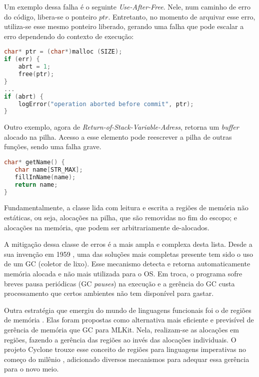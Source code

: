 Um exemplo dessa falha é o seguinte \emph{Use-After-Free}. Nele, num caminho de erro do código, libera-se o ponteiro $ptr$. Entretanto, no momento de arquivar esse erro, utiliza-se esse mesmo ponteiro liberado, gerando uma falha que pode escalar a erro dependendo do contexto de execução:
\begin{lstlisting}[language=C, label={lst:temporal-error-heap-c}, caption=Exemplo de uma Falha Temporal na \emph{Heap}]
char* ptr = (char*)malloc (SIZE);  
if (err) {
	abrt = 1;  
	free(ptr);
}  
...  
if (abrt) {
	logError("operation aborted before commit", ptr);
}
\end{lstlisting}

Outro exemplo, agora de \emph{Return-of-Stack-Variable-Adress}, retorna um \emph{buffer} alocado na pilha. Acesso a esse elemento pode reescrever a pilha de outras funções, sendo uma falha grave.

\begin{lstlisting}[language=C, label={lst:temporal-error-stack-c}, caption=Exemplo de uma Falha Temporal na Pilha]
char* getName() {
   char name[STR_MAX];  
   fillInName(name);  
   return name;
}
\end{lstlisting}

Fundamentalmente, a classe lida com leitura e escrita a regiões de memória não estáticas, ou seja, alocações na pilha, que são removidas no fim do escopo; e alocações na memória, que podem ser arbitrariamente de-alocados.


\label{sec:mem-error:GC}
A mitigação dessa classe de erros é a mais ampla e complexa desta lista. Desde a sua invenção em 1959 \cite{GCSTART}, uma das soluções mais completas presente tem sido o uso de um GC (coletor de lixo). Esse mecanismo detecta e retorna automaticamente memória alocada e não mais utilizada para o OS. Em troca, o programa sofre breves pausa periódicas (GC \emph{pauses}) na execução e a gerência do GC custa processamento que certos ambientes não tem disponível para gastar.

\label{sec:mem-error:MemReg}
Outra estratégia que emergiu do mundo de linguagens funcionais foi o de regiões de memória \cite{REGMEM}. Elas foram propostas como alternativa mais eficiente e previsível de gerência de memória que GC para MLKit. Nela, realizam-se as alocações em regiões, fazendo a gerência das regiões ao invés das alocações individuais. O projeto Cyclone trouxe esse conceito de regiões para linguagens imperativas no começo do milênio \cite{CYCLONEMEM}, adicionado diversos mecanismos para adequar essa gerência para o novo meio.

